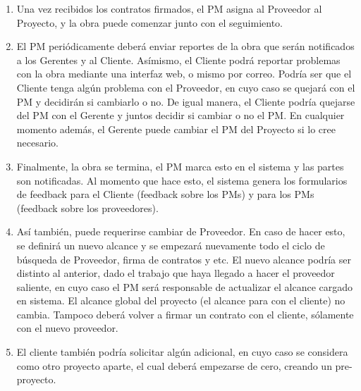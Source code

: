 \begin{enumerate}
    \item Una vez recibidos los contratos firmados, el PM asigna al Proveedor al 
    Proyecto, y la obra puede comenzar junto con el seguimiento. 
    
    \item El PM periódicamente deberá enviar reportes de la obra que serán notificados 
    a los Gerentes y al Cliente. Asímismo, el Cliente podrá reportar problemas 
    con la obra mediante una interfaz web, o mismo por correo. Podría ser que el Cliente 
    tenga algún problema con el Proveedor, en cuyo caso se quejará con el PM y decidirán 
    si cambiarlo o no. De igual manera, el Cliente podría quejarse del PM con el Gerente 
    y juntos decidir si cambiar o no el PM. En cualquier momento además, el Gerente puede cambiar el PM del Proyecto si 
    lo cree necesario. 
    
    \item Finalmente, la obra se termina, el PM marca esto en el sistema y las partes 
    son notificadas. Al momento que hace esto, el sistema genera los formularios 
    de feedback para el Cliente (feedback sobre los PMs) y para los PMs (feedback sobre 
    los proveedores). 
    
    \item Así también, puede requerirse cambiar de Proveedor. En caso de hacer 
    esto, se definirá un nuevo alcance y se empezará nuevamente todo el ciclo 
    de búsqueda de Proveedor, firma de contratos y etc. El nuevo alcance 
    podría ser distinto al anterior, dado el trabajo que haya llegado a 
    hacer el proveedor saliente, en cuyo caso el PM será responsable de actualizar 
    el alcance cargado en sistema. El alcance global del proyecto (el alcance para 
    con el cliente) no cambia. Tampoco deberá volver a firmar un contrato con el cliente, 
    sólamente con el nuevo proveedor. 
    
    \item El cliente también podría solicitar algún adicional, en cuyo caso se considera 
    como otro proyecto aparte, el cual deberá empezarse de cero, creando un pre-proyecto. 
    
\end{enumerate}

